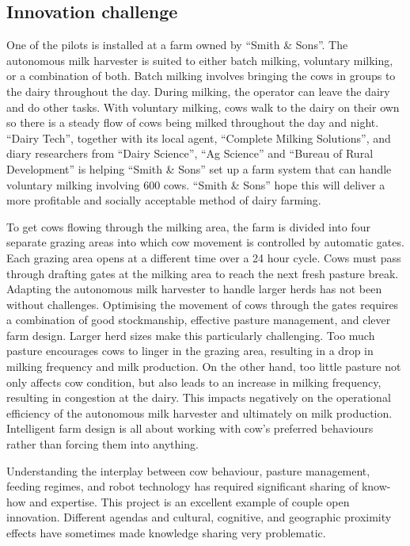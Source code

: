 \subsection{Innovation challenge}

One of the pilots is installed at a farm owned by \enquote{Smith \& Sons}. The autonomous milk harvester is suited to either batch milking, voluntary milking, or a combination of both. Batch milking involves bringing the cows in groups to the dairy throughout the day. During milking, the operator can leave the dairy and do other tasks. With voluntary milking, cows walk to the dairy on their own so there is a steady flow of cows being milked throughout the day and night. \enquote{Dairy Tech}, together with its local agent, \enquote{Complete Milking Solutions}, and diary researchers from \enquote{Dairy Science}, \enquote{Ag Science} and \enquote{Bureau of Rural Development} is helping \enquote{Smith \& Sons} set up a farm system that can handle voluntary milking involving 600 cows. \enquote{Smith \& Sons} hope this will deliver a more profitable and socially acceptable method of dairy farming. \medskip

To get cows flowing through the milking area, the farm is divided into four separate grazing areas into which cow movement is controlled by automatic gates. Each grazing area opens at a different time over a 24 hour cycle. Cows must pass through drafting gates at the milking area to reach the next fresh pasture break. Adapting the autonomous milk harvester to handle larger herds has not been without challenges. Optimising the movement of cows through the gates requires a combination of good stockmanship, effective pasture management, and clever farm design. Larger herd sizes make this particularly challenging. Too much pasture encourages cows to linger in the grazing area, resulting in a drop in milking frequency and milk production. On the other hand, too little pasture not only affects cow condition, but also leads to an increase in milking frequency, resulting in congestion at the dairy. This impacts negatively on the operational efficiency of the autonomous milk harvester and ultimately on milk production. Intelligent farm design is all about working with cow's preferred behaviours rather than forcing them into anything. \medskip

Understanding the interplay between cow behaviour, pasture management, feeding regimes, and robot technology has required significant sharing of know-how and expertise. This project is an excellent example of couple open innovation. Different agendas and cultural, cognitive, and geographic proximity effects have sometimes made knowledge sharing very problematic. \medskip

